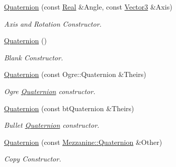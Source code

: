 \begin{DoxyCompactItemize}
\hyperlink{classMezzanine_1_1Quaternion_a86a46d0ce78a6ce83cc40ed2d03349d4}{Quaternion} (const \hyperlink{namespaceMezzanine_a726731b1a7df72bf3583e4a97282c6f6}{Real} \&Angle, const \hyperlink{classMezzanine_1_1Vector3}{Vector3} \&Axis)
\begin{DoxyCompactList}\small\item\em Axis and Rotation Constructor. \item\end{DoxyCompactList}\item 
\hyperlink{classMezzanine_1_1Quaternion_a82af0a43a12385f691ea5440da930a4f}{Quaternion} ()
\begin{DoxyCompactList}\small\item\em Blank Constructor. \item\end{DoxyCompactList}\item 
\hyperlink{classMezzanine_1_1Quaternion_a141151c34bc40191200cb641a6f97943}{Quaternion} (const Ogre::Quaternion \&Theirs)
\begin{DoxyCompactList}\small\item\em Ogre \hyperlink{classMezzanine_1_1Quaternion}{Quaternion} constructor. \item\end{DoxyCompactList}\item 
\hyperlink{classMezzanine_1_1Quaternion_af1636e407afa812df5b2908ca1e13181}{Quaternion} (const btQuaternion \&Theirs)
\begin{DoxyCompactList}\small\item\em Bullet \hyperlink{classMezzanine_1_1Quaternion}{Quaternion} constructor. \item\end{DoxyCompactList}\item 
\hyperlink{classMezzanine_1_1Quaternion_a59a9405642d5e20949273c0e03f7db3e}{Quaternion} (const \hyperlink{classMezzanine_1_1Quaternion}{Mezzanine::Quaternion} \&Other)
\begin{DoxyCompactList}\small\item\em Copy Constructor. \item\end{DoxyCompactList}\end{DoxyCompactItemize}
